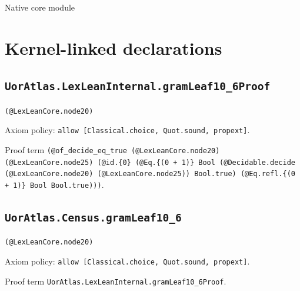 \documentclass[11pt]{article}
\begin{document}
\begin{center}{\LARGE Native core module}\end{center}
\section*{Kernel-linked declarations}
\subsection*{\texttt{UorAtlas.LexLeanInternal.gramLeaf10\_6Proof}}
\noindent\texttt{(@LexLeanCore.node20)}\par
\noindent Axiom policy: \texttt{allow [Classical.choice, Quot.sound, propext]}.\par
\noindent Proof term \texttt{(@of\_decide\_eq\_true (@LexLeanCore.node20) (@LexLeanCore.node25) (@id.\{0\} (@Eq.\{(0 + 1)\} Bool (@Decidable.decide (@LexLeanCore.node20) (@LexLeanCore.node25)) Bool.true) (@Eq.refl.\{(0 + 1)\} Bool Bool.true)))}.\par
\subsection*{\texttt{UorAtlas.Census.gramLeaf10\_6}}
\noindent\texttt{(@LexLeanCore.node20)}\par
\noindent Axiom policy: \texttt{allow [Classical.choice, Quot.sound, propext]}.\par
\noindent Proof term \texttt{UorAtlas.LexLeanInternal.gramLeaf10\_6Proof}.\par
\end{document}
